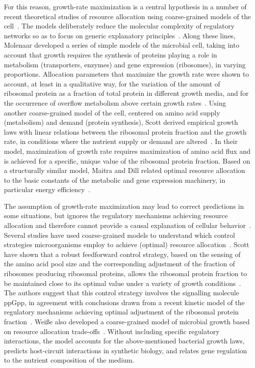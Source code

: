 For this reason, growth-rate maximization is a central hypothesis in a number of recent theoretical studies of resource allocation using coarse-grained models of the cell~\cite{molenaar_shifts_2009,scott_interdependence_2010,scott_emergence_2014}.
The models deliberately reduce the molecular complexity of regulatory networks so as to focus on generic explanatory principles~\cite{servedio_not_2014}.
Along these lines, Molenaar \etal developed a series of simple models of the microbial cell, taking into account that growth requires the synthesis of proteins playing a role in metabolism (transporters, enzymes) and gene expression (ribosomes), in varying proportions.
Allocation parameters that maximize the growth rate were shown to account, at least in a qualitative way, for the variation of the amount of ribosomal protein as a fraction of total protein in different growth media, and for the occurrence of overflow metabolism above certain growth rates~\cite{molenaar_shifts_2009}.
Using another coarse-grained model of the cell, centered on amino acid supply (metabolism) and demand (protein synthesis), Scott \etal derived empirical growth laws with linear relations between the ribosomal protein fraction and the growth rate, in conditions where the nutrient supply or demand are altered~\cite{scott_interdependence_2010,scott_emergence_2014}.
In their model, maximization of growth rate requires maximization of amino acid flux and is achieved for a specific, unique value of the ribosomal protein fraction.
Based on a structurally similar model, Maitra and Dill related optimal resource allocation to the basic constants of the metabolic and gene expression machinery, in particular energy efficiency~\cite{maitra_bacterial_2014}.

The assumption of growth-rate maximization may lead to correct predictions in some situations, but ignores the regulatory mechanisms achieving resource allocation and therefore cannot provide a causal explanation of cellular behavior~\cite{kremling_understanding_2015}.
Several studies have used coarse-grained models to understand which control strategies microorganisms employ to achieve (optimal) resource allocation~\cite{bosdriesz_how_2015,scott_emergence_2014,weisse_mechanistic_2015}.
Scott \etal have shown that a robust feedforward control strategy, based on the sensing of the amino acid pool size and the corresponding adjustment of the fraction of ribosomes producing ribosomal proteins, allows the ribosomal protein fraction to be maintained close to its optimal value under a variety of growth conditions~\cite{scott_emergence_2014}.
The authors suggest that this control strategy involves the signalling molecule ppGpp, in agreement with conclusions drawn from a recent kinetic model of the regulatory mechanisms achieving optimal adjustment of the ribosomal protein fraction~\cite{bosdriesz_how_2015}.
Wei{\ss}e \etal also developed a coarse-grained model of microbial growth based on resource allocation trade-offs~\cite{weisse_mechanistic_2015}. 
Without including specific regulatory interactions, the model accounts for the above-mentioned bacterial growth laws, predicts host-circuit interactions in synthetic biology, and relates gene regulation to the nutrient composition of the medium.

